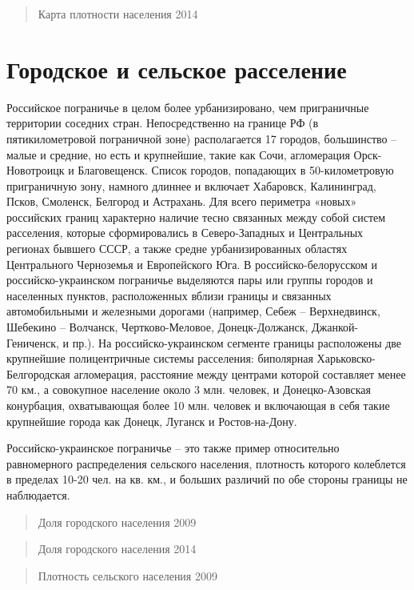 \documentclass[]{book}
\begin{document}
\begin{quote}
Карта плотности населения 2014
\end{quote}

\hypertarget{demo-urban}{%
\section{Городское и сельское расселение}\label{demo-urban}}

Российское пограничье в целом более урбанизировано, чем приграничные
территории соседних стран. Непосредственно на границе РФ (в
пятикилометровой пограничной зоне) располагается 17 городов, большинство
-- малые и средние, но есть и крупнейшие, такие как Сочи, агломерация
Орск-Новотроицк и Благовещенск. Список городов, попадающих в
50-километровую приграничную зону, намного длиннее и включает Хабаровск,
Калининград, Псков, Смоленск, Белгород и Астрахань. Для всего периметра
«новых» российских границ характерно наличие тесно связанных между собой
систем расселения, которые сформировались в Северо-Западных и
Центральных регионах бывшего СССР, а также средне урбанизированных
областях Центрального Черноземья и Европейского Юга. В
российско-белорусском и российско-украинском пограничье выделяются пары
или группы городов и населенных пунктов, расположенных вблизи границы и
связанных автомобильными и железными дорогами (например, Себеж --
Верхнедвинск, Шебекино -- Волчанск, Чертково-Меловое, Донецк-Должанск,
Джанкой-Гениченск, и пр.). На российско-украинском сегменте границы
расположены две крупнейшие полицентричные системы расселения: биполярная
Харьковско-Белгородская агломерация, расстояние между центрами которой
составляет менее 70 км., а совокупное население около 3 млн. человек, и
Донецко-Азовская конурбация, охватывающая более 10 млн. человек и
включающая в себя такие крупнейшие города как Донецк, Луганск и
Ростов-на-Дону.

Российско-украинское пограничье -- это также пример относительно
равномерного распределения сельского населения, плотность которого
колеблется в пределах 10-20 чел. на кв. км., и больших различий по обе
стороны границы не наблюдается.

\begin{quote}
Доля городского населения 2009
\end{quote}

\begin{quote}
Доля городского населения 2014
\end{quote}

\begin{quote}
Плотность сельского населения 2009
\end{quote}
\end{document}
